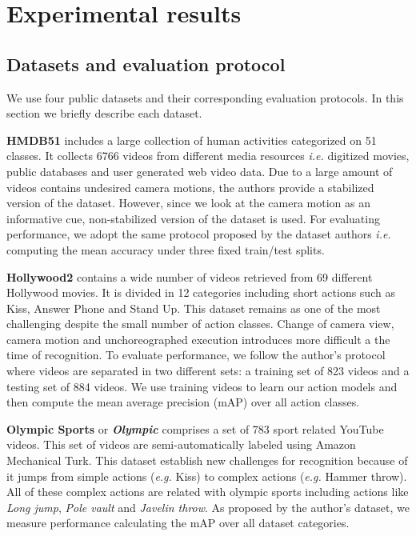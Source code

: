 \documentclass[runningheads]{llncs}
\begin{document}
\section{Experimental results}
\label{results}
\subsection{Datasets and evaluation protocol}
\label{subsec:datasets}
We use four public datasets \cite{kuehne2011, marszalek2009, niebles2010, reddy2013} and their corresponding evaluation protocols. In this section we briefly describe each dataset.

\textbf{HMDB51} \cite{kuehne2011} includes a large collection of human activities categorized on 51 classes. It collects 6766 videos from different media resources \emph{i.e.} digitized movies, public databases and user generated web video data. Due to a large amount of videos contains undesired camera motions, the authors provide a stabilized version of the dataset. However, since we look at the camera motion as an informative cue, non-stabilized version of the dataset is used. For evaluating performance, we adopt the same protocol proposed by the dataset authors \emph{i.e.} computing the mean accuracy under three fixed train/test splits.

\textbf{Hollywood2} \cite{marszalek2009} contains a wide number of videos retrieved from 69 different Hollywood movies. It is divided in 12 categories including short actions such as Kiss, Answer Phone and Stand Up. This dataset remains as one of the most challenging despite the small number of action classes. Change of camera view,  camera motion and unchoreographed execution introduces more difficult a the time of recognition. To evaluate performance, we follow the author's protocol where videos are separated in two different sets: a training set of 823 videos and a testing set of 884 videos. We use training videos to learn our action models and then compute the mean average precision (mAP) over all action classes.

\textbf{Olympic Sports} \cite{niebles2010} or \textbf\textit{{Olympic}} comprises a set of 783 sport related YouTube videos. This set of videos are semi-automatically labeled using Amazon Mechanical Turk. This dataset establish new challenges for recognition because of it jumps from simple actions (\emph{e.g.} Kiss) to complex actions (\emph{e.g.} Hammer throw). All of these complex actions are related with olympic sports including actions like \textit{Long jump}, \textit{Pole vault} and \textit{Javelin throw}. As proposed by the author's dataset, we measure performance calculating the mAP over all dataset categories.
\end{document}
